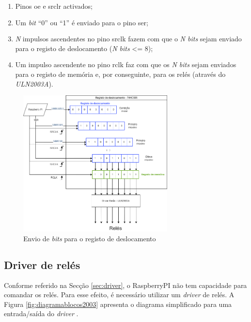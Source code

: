 \begin{enumerate}
	\item Pinos \acrshort{oe} e \acrshort{srclr} activados;
	\item Um \textit{bit} ``0'' ou ``1'' é enviado para o pino \acrshort{ser};
	\item \textit{N} impulsos ascendentes no pino \acrshort{srclk} fazem com que o \textit{N bits} sejam enviado para o registo de deslocamento (\textit{N bits} <= 8);
	\item Um impulso ascendente no pino \acrshort{rclk} faz com que os \textit{N bits} sejam enviados para o registo de memória e, por conseguinte, para os relés (através do \textit{ULN2003A}).
\end{enumerate}


\begin{figure}[hbtp]
	\centering
	\includegraphics[width=0.7\textwidth]{figures/registo deslocamente.drawio.png}
	\caption{Envio de \textit{bits} para o registo de deslocamento}
	\label{fig:esquematico74hc595}
\end{figure}

\subsection{Driver de relés}
\label{sec:driverreles}
Conforme referido na Secção \ref{sec:driver}, o \gls{RaspberryPI} não tem capacidade para comandar os relés. Para esse efeito, é necessário utilizar um \textit{driver} de relés. A Figura \ref{fig:diagramablocos2003} apresenta o diagrama simplificado para uma entrada/saída do \textit{driver} \cite{ULN2003}.

